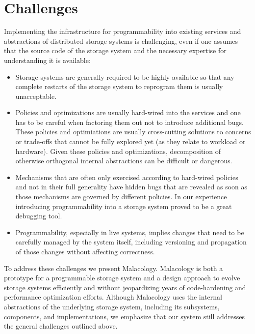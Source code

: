 \documentclass[preprint]{sigplanconf-eurosys}
\begin{document}
\section{Challenges}
\label{sec:challenges}

Implementing the infrastructure for programmability into existing services and
abstractions of distributed storage systems is challenging, even if one assumes
that the source code of the storage system and the necessary expertise for
understanding it is available:

\begin{itemize}
	
\item Storage systems are generally required to be highly available so that any
complete restarts of the storage system to reprogram them is usually
unacceptable. 

\item Policies and optimizations are usually hard-wired into the services and
one has to be careful when factoring them out not to introduce additional bugs.
These policies and optimiations are usually cross-cutting solutions to concerns
or trade-offs that cannot be fully explored yet (as they relate to workload or
hardware). Given these policies and optimizations, decomposition of otherwise
orthogonal internal abstractions can be difficult or dangerous.

\item Mechanisms that are often only exercised according to hard-wired policies and
not in their full generality have hidden bugs that are revealed as soon as
those mechanisms are governed by different policies. In our experience
introducing programmability into a storage system proved to be a great
debugging tool.

\item Programmability, especially in live systems, implies changes that need to
be carefully managed by the system itself, including versioning and propagation
of those changes without affecting correctness.

\end{itemize}

To address these challenges we present Malacology. Malacology is both a
prototype for a programmable storage system and a design approach to evolve
storage systems efficiently and without jeopardizing years of code-hardening
and performance optimization efforts.  Although Malacology uses
the internal abstractions of the underlying storage system, including its
subsystems, components, and implementations, we emphasize that our system
still addresses the general challenges outlined above.
\end{document}

